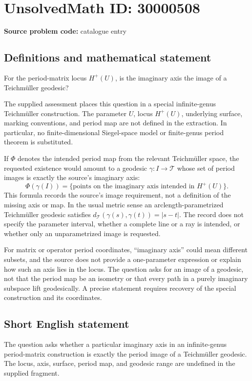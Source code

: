 \documentclass[11pt]{article}
\begin{document}
\section*{UnsolvedMath ID: 30000508}
\textbf{Source problem code:} catalogue entry
\subsection{Definitions and mathematical statement}
For the period-matrix locus $H^+(U)$, is the imaginary axis the image of a Teichm\"uller geodesic?

The supplied assessment places this question in a special infinite-genus Teichm\"uller construction. The parameter $U$, locus $H^+(U)$, underlying surface, marking conventions, and period map are not defined in the extraction. In particular, no finite-dimensional Siegel-space model or finite-genus period theorem is substituted.

If $\Phi$ denotes the intended period map from the relevant Teichm\"uller space, the requested existence would amount to a geodesic $\gamma:I\to\mathcal T$ whose set of period images is exactly the source's imaginary axis:
\[
 \Phi(\gamma(I))=\{\text{points on the imaginary axis intended in }H^+(U)\}.
\]
This formula records the source's image requirement, not a definition of the missing axis or map. In the usual metric sense an arclength-parametrized Teichm\"uller geodesic satisfies $d_{\mathcal T}(\gamma(s),\gamma(t))=|s-t|$. The record does not specify the parameter interval, whether a complete line or a ray is intended, or whether only an unparametrized image is requested.

For matrix or operator period coordinates, ``imaginary axis'' could mean different subsets, and the source does not provide a one-parameter expression or explain how such an axis lies in the locus. The question asks for an image of a geodesic, not that the period map be an isometry or that every path in a purely imaginary subspace lift geodesically. A precise statement requires recovery of the special construction and its coordinates.
\subsection{Short English statement}
The question asks whether a particular imaginary axis in an infinite-genus period-matrix construction is exactly the period image of a Teichm\"uller geodesic. The locus, axis, surface, period map, and geodesic range are undefined in the supplied fragment.
\end{document}
